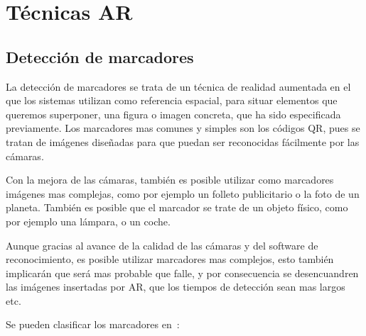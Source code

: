 \section{Técnicas AR}

	\subsection{Detección de marcadores}
	
	La detección de marcadores se trata de un técnica de realidad aumentada en el que los sistemas utilizan como referencia espacial, para situar elementos que queremos superponer, una figura o imagen concreta, que ha sido especificada previamente. Los marcadores mas comunes y simples son los códigos QR, pues se tratan de imágenes diseñadas para que puedan ser reconocidas fácilmente por las cámaras.
	
	\label{marcadorSencillo}
	
	Con la mejora de las cámaras, también es posible utilizar como marcadores imágenes mas complejas, como por ejemplo un folleto publicitario o la foto de un planeta.
	También es posible que el marcador se trate de un objeto físico, como por ejemplo una lámpara, o un coche.
	
	
	Aunque gracias al avance de la calidad de las cámaras y del software de reconocimiento, es posible utilizar marcadores mas complejos, esto también implicarán que será mas probable que falle, y por consecuencia se desencuandren las imágenes insertadas por AR, que los tiempos de detección sean mas largos etc.
	
	Se pueden clasificar los marcadores en~\cite{linowes_babilinski_2017}:
	
	
		
